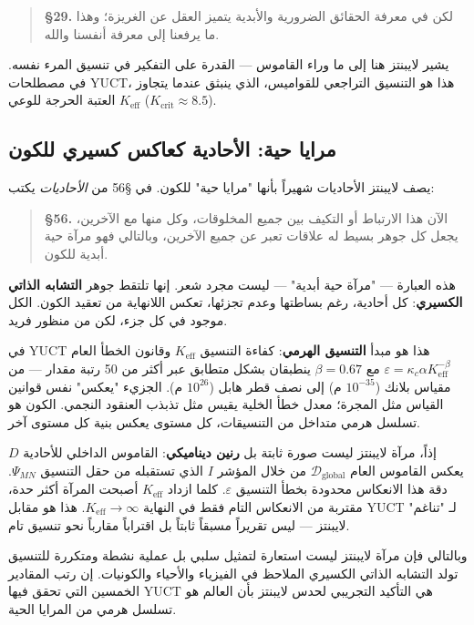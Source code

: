 \documentclass[12pt,a4paper]{article}
\begin{document}
	\begin{quote}
		\textbf{§29.} لكن في معرفة الحقائق الضرورية والأبدية يتميز العقل عن الغريزة؛ وهذا ما يرفعنا إلى معرفة أنفسنا والله.
	\end{quote}
	
	يشير لايبنتز هنا إلى ما وراء القاموس — القدرة على التفكير في تنسيق المرء نفسه. في مصطلحات YUCT، هذا هو التنسيق التراجعي للقواميس، الذي ينبثق عندما يتجاوز \(K_{\mathrm{eff}}\) العتبة الحرجة للوعي (\(K_{\mathrm{crit}} \approx 8.5\)).
	
	\subsection{مرايا حية: الأحادية كعاكس كسيري للكون}
	
	يصف لايبنتز الأحاديات شهيراً بأنها "مرايا حية" للكون. في §56 من \emph{الأحاديات} يكتب:
	
	\begin{quote}
		\textbf{§56.} الآن هذا الارتباط أو التكيف بين جميع المخلوقات، وكل منها مع الآخرين، يجعل كل جوهر بسيط له علاقات تعبر عن جميع الآخرين، وبالتالي فهو مرآة حية أبدية للكون.
	\end{quote}
	
	هذه العبارة — "مرآة حية أبدية" — ليست مجرد شعر. إنها تلتقط جوهر \textbf{التشابه الذاتي الكسيري}: كل أحادية، رغم بساطتها وعدم تجزئها، تعكس اللانهاية من تعقيد الكون. الكل موجود في كل جزء، لكن من منظور فريد.
	
	في YUCT هذا هو مبدأ \textbf{التنسيق الهرمي}: كفاءة التنسيق \(K_{\mathrm{eff}}\) وقانون الخطأ العام \(\varepsilon = \kappa_c \alpha K_{\mathrm{eff}}^{-\beta}\) مع \(\beta=0.67\) ينطبقان بشكل متطابق عبر أكثر من 50 رتبة مقدار — من مقياس بلانك (\(10^{-35}\) م) إلى نصف قطر هابل (\(10^{26}\) م). الجزيء "يعكس" نفس قوانين القياس مثل المجرة؛ معدل خطأ الخلية يقيس مثل تذبذب العنقود النجمي. الكون هو تسلسل هرمي متداخل من التنسيقات، كل مستوى يعكس بنية كل مستوى آخر.
	
	إذاً، مرآة لايبنتز ليست صورة ثابتة بل \textbf{رنين ديناميكي}: القاموس الداخلي للأحادية \(D\) يعكس القاموس العام \(\mathcal{D}_{\text{global}}\) من خلال المؤشر \(I\) الذي تستقبله من حقل التنسيق \(\Psi_{MN}\). دقة هذا الانعكاس محدودة بخطأ التنسيق \(\varepsilon\). كلما ازداد \(K_{\mathrm{eff}}\) أصبحت المرآة أكثر حدة، مقتربة من الانعكاس التام فقط في النهاية \(K_{\mathrm{eff}} \to \infty\). هذا هو مقابل YUCT لـ "تناغم" لايبنتز — ليس تقريراً مسبقاً ثابتاً بل اقتراباً مقارباً نحو تنسيق تام.
	
	وبالتالي فإن مرآة لايبنتز ليست استعارة لتمثيل سلبي بل عملية نشطة ومتكررة للتنسيق تولد التشابه الذاتي الكسيري الملاحظ في الفيزياء والأحياء والكونيات. إن رتب المقادير الخمسين التي تحقق فيها YUCT هي التأكيد التجريبي لحدس لايبنتز بأن العالم هو تسلسل هرمي من المرايا الحية.
	
\end{document}
